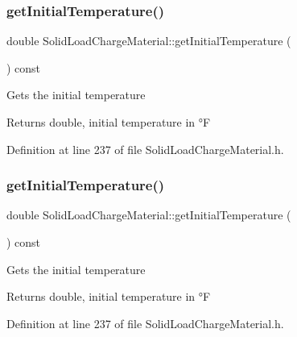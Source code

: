 \subsubsection{\texorpdfstring{get\+Initial\+Temperature()}{getInitialTemperature()}\hspace{0.1cm}{\footnotesize\ttfamily [1/3]}}
{\footnotesize\ttfamily double Solid\+Load\+Charge\+Material\+::get\+Initial\+Temperature (\begin{DoxyParamCaption}{ }\end{DoxyParamCaption}) const\hspace{0.3cm}{\ttfamily [inline]}}

Gets the initial temperature \begin{DoxyReturn}{Returns}
double, initial temperature in °F 
\end{DoxyReturn}


Definition at line 237 of file Solid\+Load\+Charge\+Material.\+h.

\mbox{\label{class_solid_load_charge_material_ae5d7f198fb1d4a3adb0cfc911a13ea06}} 
\subsubsection{\texorpdfstring{get\+Initial\+Temperature()}{getInitialTemperature()}\hspace{0.1cm}{\footnotesize\ttfamily [2/3]}}
{\footnotesize\ttfamily double Solid\+Load\+Charge\+Material\+::get\+Initial\+Temperature (\begin{DoxyParamCaption}{ }\end{DoxyParamCaption}) const\hspace{0.3cm}{\ttfamily [inline]}}

Gets the initial temperature \begin{DoxyReturn}{Returns}
double, initial temperature in °F 
\end{DoxyReturn}


Definition at line 237 of file Solid\+Load\+Charge\+Material.\+h.

\mbox{\label{class_solid_load_charge_material_ae5d7f198fb1d4a3adb0cfc911a13ea06}} 
